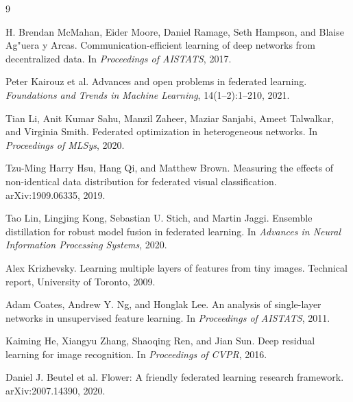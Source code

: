 \documentclass[11pt]{article}
\begin{document}
\begin{thebibliography}{9}

H. Brendan McMahan, Eider Moore, Daniel Ramage, Seth Hampson, and Blaise Ag{"u}era y Arcas.
\newblock Communication-efficient learning of deep networks from decentralized data.
\newblock In \emph{Proceedings of AISTATS}, 2017.

Peter Kairouz et al.
\newblock Advances and open problems in federated learning.
\newblock \emph{Foundations and Trends in Machine Learning}, 14(1--2):1--210, 2021.

Tian Li, Anit Kumar Sahu, Manzil Zaheer, Maziar Sanjabi, Ameet Talwalkar, and Virginia Smith.
\newblock Federated optimization in heterogeneous networks.
\newblock In \emph{Proceedings of MLSys}, 2020.

Tzu-Ming Harry Hsu, Hang Qi, and Matthew Brown.
\newblock Measuring the effects of non-identical data distribution for federated visual classification.
\newblock arXiv:1909.06335, 2019.

Tao Lin, Lingjing Kong, Sebastian U. Stich, and Martin Jaggi.
\newblock Ensemble distillation for robust model fusion in federated learning.
\newblock In \emph{Advances in Neural Information Processing Systems}, 2020.

Alex Krizhevsky.
\newblock Learning multiple layers of features from tiny images.
\newblock Technical report, University of Toronto, 2009.

Adam Coates, Andrew Y. Ng, and Honglak Lee.
\newblock An analysis of single-layer networks in unsupervised feature learning.
\newblock In \emph{Proceedings of AISTATS}, 2011.

Kaiming He, Xiangyu Zhang, Shaoqing Ren, and Jian Sun.
\newblock Deep residual learning for image recognition.
\newblock In \emph{Proceedings of CVPR}, 2016.

Daniel J. Beutel et al.
\newblock Flower: A friendly federated learning research framework.
\newblock arXiv:2007.14390, 2020.

\end{thebibliography}
\end{document}
